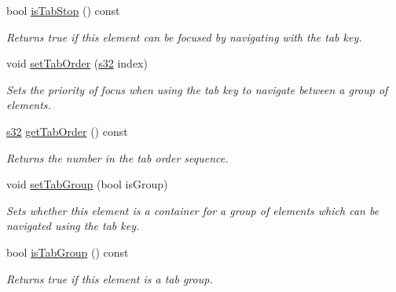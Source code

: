 \begin{DoxyCompactItemize}
bool \hyperlink{classirr_1_1gui_1_1IGUIElement_a0f9c536acf8a57faa18d61ff5b0bf567}{is\+Tab\+Stop} () const
\begin{DoxyCompactList}\small\item\em Returns true if this element can be focused by navigating with the tab key. \end{DoxyCompactList}\item 
void \hyperlink{classirr_1_1gui_1_1IGUIElement_a1aabac2cce7847e5ab17f6c88d129ef7}{set\+Tab\+Order} (\hyperlink{namespaceirr_ac66849b7a6ed16e30ebede579f9b47c6}{s32} index)
\begin{DoxyCompactList}\small\item\em Sets the priority of focus when using the tab key to navigate between a group of elements. \end{DoxyCompactList}\item 
\mbox{\label{classirr_1_1gui_1_1IGUIElement_af1f535aacf6e19fda64511715100e069}} 
\hyperlink{namespaceirr_ac66849b7a6ed16e30ebede579f9b47c6}{s32} \hyperlink{classirr_1_1gui_1_1IGUIElement_af1f535aacf6e19fda64511715100e069}{get\+Tab\+Order} () const
\begin{DoxyCompactList}\small\item\em Returns the number in the tab order sequence. \end{DoxyCompactList}\item 
void \hyperlink{classirr_1_1gui_1_1IGUIElement_aa44a46f3b639ca1b095f855c9d9c959d}{set\+Tab\+Group} (bool is\+Group)
\begin{DoxyCompactList}\small\item\em Sets whether this element is a container for a group of elements which can be navigated using the tab key. \end{DoxyCompactList}\item 
\mbox{\label{classirr_1_1gui_1_1IGUIElement_a70596321725a708ecea4974d4df760c9}} 
bool \hyperlink{classirr_1_1gui_1_1IGUIElement_a70596321725a708ecea4974d4df760c9}{is\+Tab\+Group} () const
\begin{DoxyCompactList}\small\item\em Returns true if this element is a tab group. \end{DoxyCompactList}\item 
\mbox{\label{classirr_1_1gui_1_1IGUIElement_ab6266a2fd3d8b0be385f9f3f3364e9ff}} 

\end{DoxyCompactItemize}
